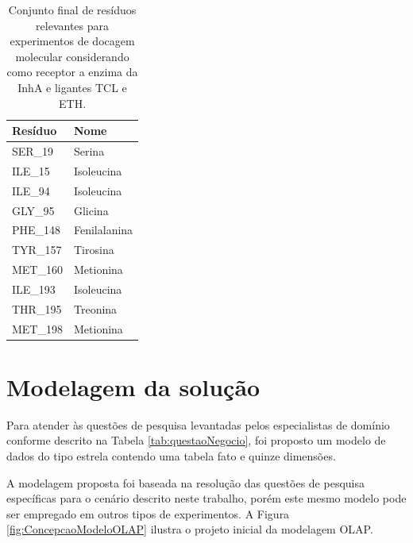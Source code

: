 \begin{table}[h]
\caption{Conjunto final de resíduos relevantes para experimentos de docagem molecular considerando como receptor a enzima da InhA e ligantes TCL e ETH.}
\label{tab:listaProvavelRelevantes}
\centering
\begin{tabular}{@{}ll@{}}
\toprule
\textbf{Resíduo} 		    & \textbf{Nome} 		 \\ \midrule
SER\_19                     & Serina                   \\
ILE\_15                     & Isoleucina               \\
ILE\_94                     & Isoleucina               \\
GLY\_95                     & Glicina                  \\
PHE\_148                    & Fenilalanina             \\
TYR\_157                    & Tirosina                 \\
MET\_160                    & Metionina                \\
ILE\_193                    & Isoleucina               \\
THR\_195                    & Treonina                 \\
MET\_198                    & Metionina                \\ \bottomrule
\end{tabular}
\end{table}

\section{Modelagem da solução}
\label{sec:ModelagemDaSolucao}

Para atender às questões de pesquisa levantadas pelos especialistas de domínio conforme descrito na Tabela \ref{tab:questaoNegocio}, foi proposto um modelo de dados do tipo estrela contendo uma tabela fato e quinze dimensões. 

A modelagem proposta foi baseada na resolução das questões de pesquisa específicas para o cenário descrito neste trabalho, porém este mesmo modelo pode ser empregado em outros tipos de experimentos. A Figura \ref{fig:ConcepcaoModeloOLAP} ilustra o projeto inicial da modelagem OLAP.


